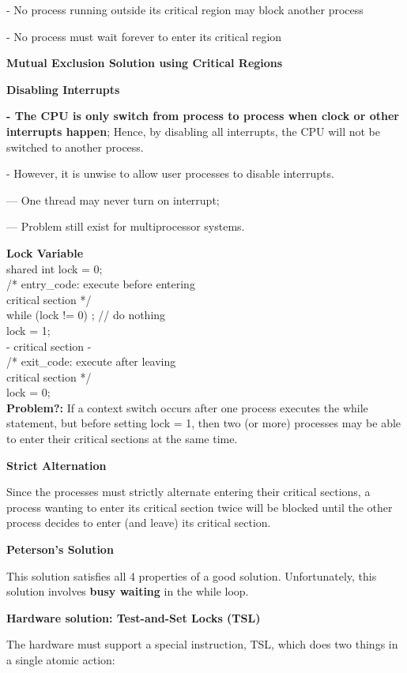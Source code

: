 \documentclass[]{report}
\begin{document}
- No process running outside its critical region may block
another process

- No process must wait forever to enter its critical region

\textbf{Mutual Exclusion Solution using Critical Regions}

\textbf{Disabling Interrupts}

\textbf{- The CPU is only switch from process to process
when clock or other interrupts happen}; Hence, by
disabling all interrupts, the CPU will not be
switched to another process.

- However, it is unwise to allow user processes to
disable interrupts.

--- One thread may never turn on interrupt;

--- Problem still exist for multiprocessor systems.

\textbf{Lock Variable}
\\shared int lock = 0;\\
/* entry\_code: execute before entering\\ critical section */\\
while (lock != 0) ; // do nothing\\
lock = 1;\\
- critical section -\\
/* exit\_code: execute after leaving\\ critical section */\\
lock = 0;\\
\textbf{Problem?: }If a context switch occurs after one process executes
the while statement, but before setting lock = 1,
then two (or more) processes may be able to enter
their critical sections at the same time.

\textbf{Strict Alternation}

Since the processes must strictly alternate entering their
critical sections, a process wanting to enter its critical
section twice will be blocked until the other process
decides to enter (and leave) its critical section.

\textbf{Peterson’s Solution}

This solution satisfies all 4 properties of a good solution. Unfortunately,
this solution involves \textbf{busy waiting} in the while loop.

\textbf{Hardware solution: Test-and-Set Locks (TSL)}

The hardware must support a special instruction, TSL,
which does two things in a single atomic action:
\end{document}
